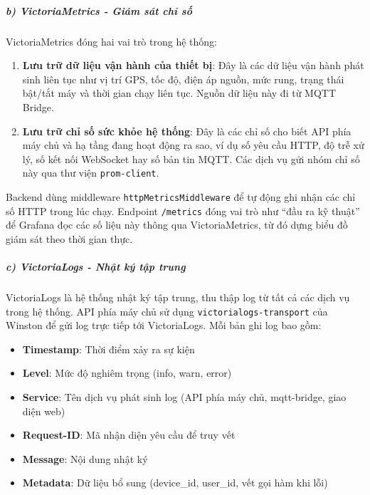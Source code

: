 \documentclass[a4paper]{extarticle}
\providecommand{\tightlist}{%
  \setlength{\itemsep}{0pt}\setlength{\parskip}{0pt}}
\begin{document}
\subparagraph{b) VictoriaMetrics - Giám sát chỉ số}\label{b-victoriametrics---giuxe1m-suxe1t-chux1ec9-sux1ed1-metrics}

VictoriaMetrics đóng hai vai trò trong hệ thống:

\begin{enumerate}
\def\labelenumi{\arabic{enumi}.}
\tightlist
\item
  \textbf{Lưu trữ dữ liệu vận hành của thiết bị}: Đây là các dữ liệu vận hành
  phát sinh liên tục như vị trí GPS, tốc độ, điện áp nguồn, mức rung,
  trạng thái bật/tắt máy và thời gian chạy liên tục. Nguồn dữ liệu này đi từ MQTT Bridge.
\item
  \textbf{Lưu trữ chỉ số sức khỏe hệ thống}: Đây là các chỉ số cho biết
  API phía máy chủ và hạ tầng đang hoạt động ra sao, ví dụ số yêu cầu HTTP, độ
  trễ xử lý, số kết nối WebSocket hay số bản tin MQTT. Các dịch vụ gửi
  nhóm chỉ số này qua thư viện \texttt{prom-client}.
\end{enumerate}

Backend dùng middleware \texttt{httpMetricsMiddleware} để tự động ghi
nhận các chỉ số HTTP trong lúc chạy. Endpoint \texttt{/metrics} đóng vai
trò như ``đầu ra kỹ thuật'' để Grafana đọc các số liệu này thông qua
VictoriaMetrics, từ đó dựng biểu đồ giám sát theo thời gian thực.

\subparagraph{c) VictoriaLogs - Nhật ký tập trung}\label{c-victorialogs---nhux1eadt-kuxfd-tux1eadp-trung-centralized-logging}

VictoriaLogs là hệ thống nhật ký tập trung, thu thập log từ tất cả các
dịch vụ trong hệ thống. API phía máy chủ sử dụng \texttt{victorialogs-transport}
của Winston để gửi log trực tiếp tới VictoriaLogs. Mỗi bản ghi log bao
gồm:

\begin{itemize}
\tightlist
\item
  \textbf{Timestamp}: Thời điểm xảy ra sự kiện
\item
  \textbf{Level}: Mức độ nghiêm trọng (info, warn, error)
\item
  \textbf{Service}: Tên dịch vụ phát sinh log (API phía máy chủ, mqtt-bridge,
  giao diện web)
\item
  \textbf{Request-ID}: Mã nhận diện yêu cầu để truy vết
\item
  \textbf{Message}: Nội dung nhật ký
\item
  \textbf{Metadata}: Dữ liệu bổ sung (device\_id, user\_id, vết gọi hàm khi lỗi)
\end{itemize}
\end{document}
